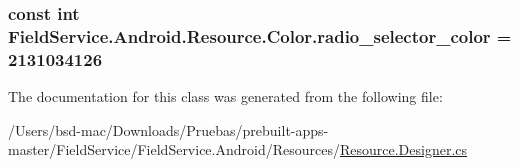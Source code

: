 \hypertarget{class_field_service_1_1_android_1_1_resource_1_1_color_a9340996216c145b0f25bf7fd5e609fe0}{
\subsubsection[{radio\+\_\+selector\+\_\+color}]{\setlength{\rightskip}{0pt plus 5cm}const int Field\+Service.\+Android.\+Resource.\+Color.\+radio\+\_\+selector\+\_\+color = 2131034126}}\label{class_field_service_1_1_android_1_1_resource_1_1_color_a9340996216c145b0f25bf7fd5e609fe0}


The documentation for this class was generated from the following file\+:\begin{DoxyCompactItemize}
\item 
/\+Users/bsd-\/mac/\+Downloads/\+Pruebas/prebuilt-\/apps-\/master/\+Field\+Service/\+Field\+Service.\+Android/\+Resources/\hyperlink{_field_service_8_android_2_resources_2_resource_8designer_8cs}{Resource.\+Designer.\+cs}\end{DoxyCompactItemize}
